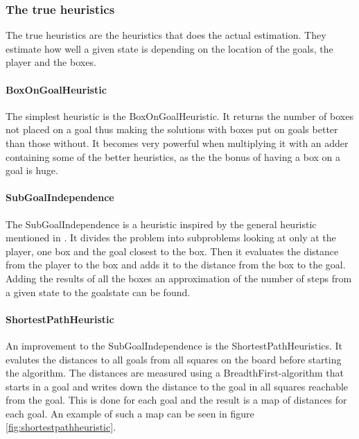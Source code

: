 \subsubsection{The true heuristics}
The true heuristics are the heuristics that does the actual
estimation. They estimate how well a given state is depending on the
location of the goals, the player and the boxes.

\paragraph{BoxOnGoalHeuristic}The simplest heuristic is the
BoxOnGoalHeuristic. It returns the number of boxes not placed on a
goal thus making the solutions with boxes put on goals better than
those without. It becomes very powerful when multiplying it with an
adder containing some of the better heuristics, as the the bonus of
having a box on a goal is huge.

\paragraph{SubGoalIndependence}The SubGoalIndependence is a heuristic
inspired by the general heuristic mentioned in
\citet{Russell2003GeneralHeuristics}. It divides the problem into
subproblems looking at only at the player, one box and the goal
closest to the box. Then it evaluates the distance from the player to
the box and adds it to the distance from the box to the goal. Adding
the results of all the boxes an approximation of the number of steps
from a given state to the goalstate can be found.

\paragraph{ShortestPathHeuristic}An improvement to the
SubGoalIndependence is the ShortestPathHeuristics. It evalutes the
distances to all goals from all squares on the board before starting
the \astar algorithm. The distances are measured using a
BreadthFirst-algorithm that starts in a goal and writes down the
distance to the goal in all squares reachable from the goal. This is
done for each goal and the result is a map of distances for each
goal. An example of such a map can be seen in figure
\ref{fig:shortestpathheuristic}.

